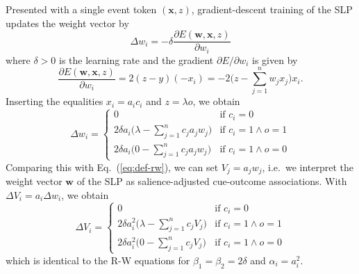 \documentclass[conference]{IEEEtran}
\begin{document}
Presented with a single event token $(\mathbf{x}, z)$, gradient-descent training of the SLP updates the weight vector by 
\begin{equation}
  \label{eq:gd-rule}
  \Delta w_i = -\delta \frac{\partial E(\mathbf{w}, \mathbf{x}, z)}{\partial w_i}
\end{equation}
where $\delta > 0$ is the learning rate and the gradient $\partial E / \partial w_i$ is given by
\begin{equation}
  \label{eq:gd-gradient}
  \frac{\partial E(\mathbf{w}, \mathbf{x}, z)}{\partial w_i} = 2 (z - y) (-x_i)
  = -2 \biggl( z - \sum_{j=1}^n w_j x_j \biggr) x_i .
\end{equation}
Inserting the equalities $x_i = a_i c_i$ and $z = \lambda o$, we obtain
\begin{equation}
  \label{eq:slp-delta}
  \Delta w_i =
  \begin{cases}
    0 & \text{if } c_i = 0\\
    2 \delta a_i \bigl(\lambda - \sum_{j=1}^n c_j a_j w_j \bigr) & \text{if } c_i = 1 \wedge o = 1 \\
    2 \delta a_i \bigl(0 - \sum_{j=1}^n c_j a_j w_j \bigr) & \text{if } c_i = 1 \wedge o = 0 
  \end{cases}
\end{equation}
Comparing this with Eq.~(\ref{eq:def-rw}), we can set $V_j = a_j w_j$, i.e.\ we interpret the weight vector $\mathbf{w}$ of the SLP as salience-adjusted cue-outcome associations.  With $\Delta V_i = a_i \Delta w_i$, we obtain
\begin{equation}
  \label{eq:slp-delta-as-rw}
  \Delta V_i =
  \begin{cases}
    0 & \text{if } c_i = 0\\
    2 \delta a_i^2 \bigl(\lambda - \sum_{j=1}^n c_j V_j \bigr) & \text{if } c_i = 1 \wedge o = 1 \\
    2 \delta a_i^2 \bigl(0 - \sum_{j=1}^n c_j V_j \bigr) & \text{if } c_i = 1 \wedge o = 0
  \end{cases}
\end{equation}
which is identical to the R-W equations for $\beta_1 = \beta_2 = 2\delta$ and $\alpha_i = a_i^2$.
\end{document}
